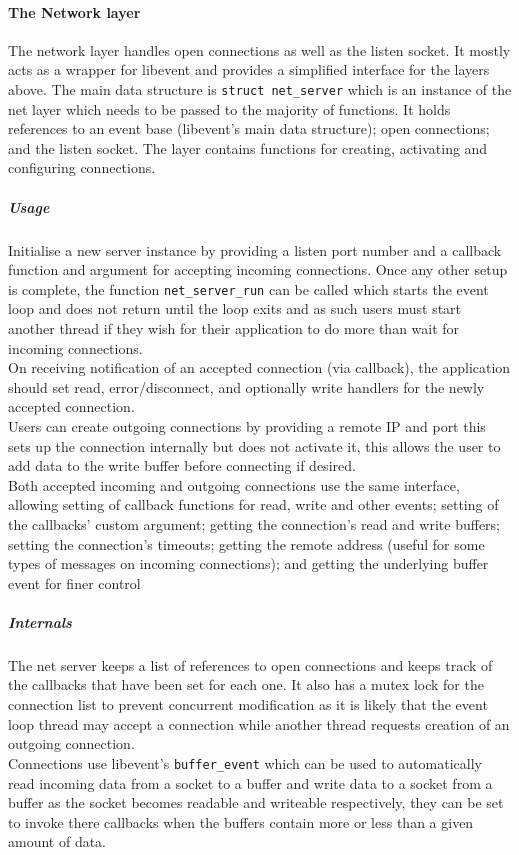 \documentclass{article}
\begin{document}
\paragraph{The Network layer}
The network layer handles open connections as well as the listen socket. It mostly acts as a wrapper for libevent and provides a simplified interface for the layers above. The main data structure is \texttt{struct net\_server} which is an instance of the net layer which needs to be passed to the majority of functions. It holds references to an event base (libevent's main data structure); open connections; and the listen socket. The layer contains functions for creating, activating and configuring connections.
\subparagraph{Usage}
Initialise a new server instance by providing a listen port number and a callback function and argument for accepting incoming connections. Once any other setup is complete, the function \texttt{net\_server\_run} can be called which starts the event loop and does not return until the loop exits and as such users must start another thread if they wish for their application to do more than wait for incoming connections.
\\
On receiving notification of an accepted connection (via callback), the application should set read, error/disconnect, and optionally write handlers for the newly accepted connection.
\\
Users can create outgoing connections by providing a remote IP and port this sets up the connection internally but does not activate it, this allows the user to add data to the write buffer before connecting if desired.
\\
Both accepted incoming and outgoing connections use the same interface, allowing setting of callback functions for read, write and other events; setting of the callbacks' custom argument; getting the connection's read and write buffers; setting the connection's timeouts; getting the remote address (useful for some types of messages on incoming connections); and getting the underlying buffer event for finer control

\subparagraph{Internals}
The net server keeps a list of references to open connections and keeps track of the callbacks that have been set for each one. It also has a mutex lock for the connection list to prevent concurrent modification as it is likely that the event loop thread may accept a connection while another thread requests creation of an outgoing connection.
\\
Connections use libevent's \texttt{buffer\_event} which can be used to automatically read incoming data from a socket to a buffer and write data to a socket from a buffer as the socket becomes readable and writeable respectively, they can be set to invoke there callbacks when the buffers contain more or less than a given amount of data.
\end{document}
